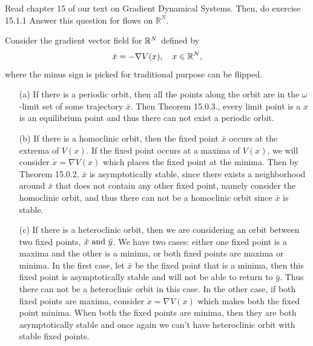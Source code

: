 \documentclass[12pt]{report}
\begin{document}


\begin{problem}
    Read chapter 15 of our text on Gradient Dynamical Systems.  Then, do exercise 15.1.1  Answer this question for flows on $\mathbb{R}^N$. 
\end{problem}

\begin{solution}

    \noindent
    Consider the gradient vector field for ${\mathbb R}^N$ defined by 
    \[
        \dot{x} = - \nabla V(x), \quad x \in {\mathbb R}^N,
    \]
    where the minus sign is picked for traditional purpose can be flipped.
    \begin{enumerate}
        \item [(a)]
        If there is a periodic orbit, then all the points along the orbit are in the $\omega$-limit set of some trajectory $\bar{x}$. Then Theorem 15.0.3., every limit point is a $x$ is an equilibrium point and thus there can not exist a periodic orbit.

        \item [(b)]
        If there is a homoclinic orbit, then the fixed point $\bar{x}$ occurs at the extrema of $V(x)$. If the fixed point occurs at a maxima of $V(x)$, we will consider $\dot{x} = \nabla V(x)$ which places the fixed point at the minima. Then by Theorem 15.0.2, $\bar{x}$ is asymptotically stable, since there exists a neighborhood around $\bar{x}$ that does not contain any other fixed point, namely consider the homoclinic orbit, and thus there can not be a homoclinic orbit since $\bar{x}$ is stable.   
        
        \item [(c)]
        If there is a heteroclinic orbit, then we are considering an orbit between two fixed points, $\bar{x} {~\text{and}~} \bar{y}$. We have two cases: either one fixed point is a maxima and the other is a minima, or both fixed points are maxima or minima. In the first case, let $\bar{x}$ be the fixed point that is a minima, then this fixed point is asymptotically stable and will not be able to return to $\bar{y}$. Thus there can not be a heteroclinic orbit in this case. In the other case, if both fixed points are maxima, consider $\dot{x} = \nabla V(x)$ which makes both the fixed point minima. When both the fixed points are minima, then they are both asymptotically stable and once again we can't have heteroclinic orbit with stable fixed points. 
    \end{enumerate}
\end{solution}
\end{document}
